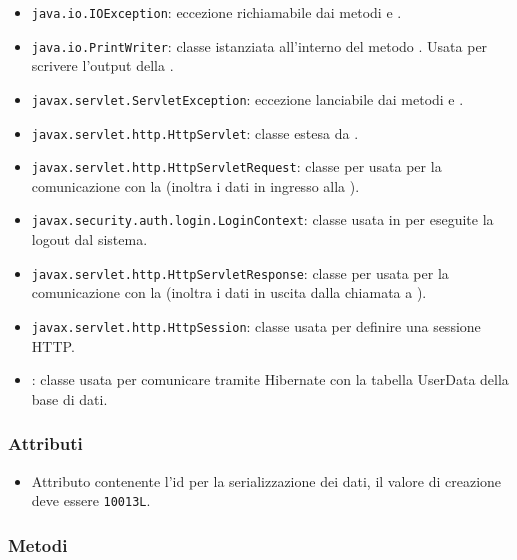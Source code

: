 \begin{itemize}
	\item \texttt{java.io.IOException}: eccezione richiamabile dai metodi  e .
	\item \texttt{java.io.PrintWriter}: classe istanziata all'interno del metodo . Usata per scrivere l'output della .
	\item \texttt{javax.servlet.ServletException}: eccezione lanciabile dai metodi  e .
	\item \texttt{javax.servlet.http.HttpServlet}: classe estesa da .
	\item \texttt{javax.servlet.http.HttpServletRequest}:  classe per usata per la comunicazione con la  (inoltra i dati in ingresso alla ).
	\item \texttt{javax.security.auth.login.LoginContext}: classe usata in  per eseguite la logout dal sistema.
	\item \texttt{javax.servlet.http.HttpServletResponse}: classe per usata per la comunicazione con la  (inoltra i dati in uscita dalla chiamata a ).
	\item \texttt{javax.servlet.http.HttpSession}: classe usata per definire una sessione HTTP.
	\item {}: classe usata per comunicare tramite Hibernate con la tabella UserData della base di dati.
\end{itemize}

\subsubsection*{Attributi}

\begin{itemize}
	\item{}
	Attributo contenente l'id per la serializzazione dei dati, il valore di creazione deve essere \texttt{10013L}.
\end{itemize}

\subsubsection*{Metodi}

